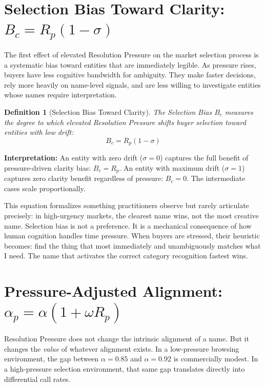 \documentclass[12pt, openany]{book}
\theoremstyle{thmstyle}
\theoremstyle{defstyle}
\newtheorem{definition}{Definition}[chapter]
\begin{document}
\section{Selection Bias Toward Clarity: $B_c = R_p(1-\sigma)$}

The first effect of elevated Resolution Pressure on the market selection process is a systematic bias toward entities that are immediately legible. As pressure rises, buyers have less cognitive bandwidth for ambiguity. They make faster decisions, rely more heavily on name-level signals, and are less willing to investigate entities whose names require interpretation.

\begin{definition}[Selection Bias Toward Clarity]
The Selection Bias $B_c$ measures the degree to which elevated Resolution Pressure shifts buyer selection toward entities with low drift:
\begin{equation}
B_c = R_p(1 - \sigma)
\label{eq:selection_bias}
\end{equation}
\end{definition}

\textbf{Interpretation:} An entity with zero drift ($\sigma = 0$) captures the full benefit of pressure-driven clarity bias: $B_c = R_p$. An entity with maximum drift ($\sigma = 1$) captures zero clarity benefit regardless of pressure: $B_c = 0$. The intermediate cases scale proportionally.

This equation formalizes something practitioners observe but rarely articulate precisely: in high-urgency markets, the clearest name wins, not the most creative name. Selection bias is not a preference. It is a mechanical consequence of how human cognition handles time pressure. When buyers are stressed, their heuristic becomes: find the thing that most immediately and unambiguously matches what I need. The name that activates the correct category recognition fastest wins.

\section{Pressure-Adjusted Alignment: $\alpha_p = \alpha(1 + \omega R_p)$}

Resolution Pressure does not change the intrinsic alignment of a name. But it changes the \textit{value} of whatever alignment exists. In a low-pressure browsing environment, the gap between $\alpha = 0.85$ and $\alpha = 0.92$ is commercially modest. In a high-pressure selection environment, that same gap translates directly into differential call rates.
\end{document}
